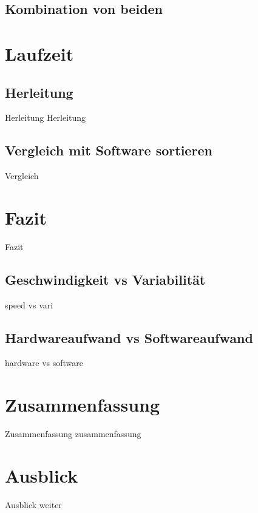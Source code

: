 \documentclass[ucs,9pt]{beamer}
\begin{document}
\subsection*{Kombination von beiden}
\section{Laufzeit}
\subsection{Herleitung}
\begin{frame}{Herleitung}
Herleitung
\end{frame}
\subsection{Vergleich mit Software sortieren}
\begin{frame}
Vergleich
\end{frame}
\section{Fazit}
\begin{frame}
Fazit
\end{frame}
\subsection{Geschwindigkeit vs Variabilität}
\begin{frame}
speed vs vari
\end{frame}
\subsection{Hardwareaufwand vs Softwareaufwand}
\begin{frame}
hardware vs software
\end{frame}

\section{Zusammenfassung}
\begin{frame}{Zusammenfassung}
zusammenfassung
\end{frame}
\section{Ausblick}
\begin{frame}{Ausblick}
weiter
\end{frame}
\end{document}

